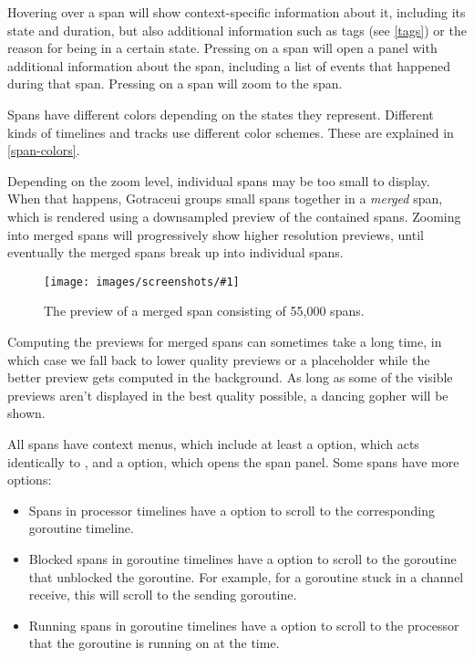 \documentclass[10pt,letterpaper,oneside,openany,english]{memoir}
\newcommand{\shortcut}{\ctrl{} or \cmdmac}
\newcommand{\screenshot}[2]{%
\begin{figure}[!ht]
  \centering
  \texttt{[image: images/screenshots/\#1]}
  \caption{#2}
\end{figure}}
\begin{document}
Hovering over a span will show context-specific information about it,
including its state and duration,
but also additional information such as tags (see \cref{tags})
or the reason for being in a certain state.
Pressing  on a span will open a panel with additional information about the span, including a list of events that happened during that span.
Pressing \keys{\shortcut + LMB} on a span will zoom to the span.

Spans have different colors depending on the states they represent.
Different kinds of timelines and tracks use different color schemes.
These are explained in \cref{span-colors}.

Depending on the zoom level, individual spans may be too small to display.
When that happens, Gotraceui groups small spans together in a \emph{merged} span,
which is rendered using a downsampled preview of the contained spans.
Zooming into merged spans will progressively show higher resolution previews,
until eventually the merged spans break up into individual spans.

\screenshot{merged-span.png}{The preview of a merged span consisting of 55,000 spans.}

Computing the previews for merged spans can sometimes take a long time,
in which case we fall back to lower quality previews or a placeholder while the better preview gets computed in the background.
As long as some of the visible previews aren't displayed in the best quality possible,
a dancing gopher will be shown.

All spans have context menus,
which include at least a  option,
which acts identically to \keys{\shortcut + LMB},
and a  option, which opens the span panel.
Some spans have more options:

\begin{itemize}
\item Spans in processor timelines have a  option to scroll to the corresponding goroutine timeline.
\item Blocked spans in goroutine timelines have a  option to scroll to the goroutine that unblocked the goroutine.
  For example, for a goroutine stuck in a channel receive, this will scroll to the sending goroutine.
\item Running spans in goroutine timelines have a  option to scroll to the processor that the goroutine is running on at the time.
\end{itemize}
\end{document}
